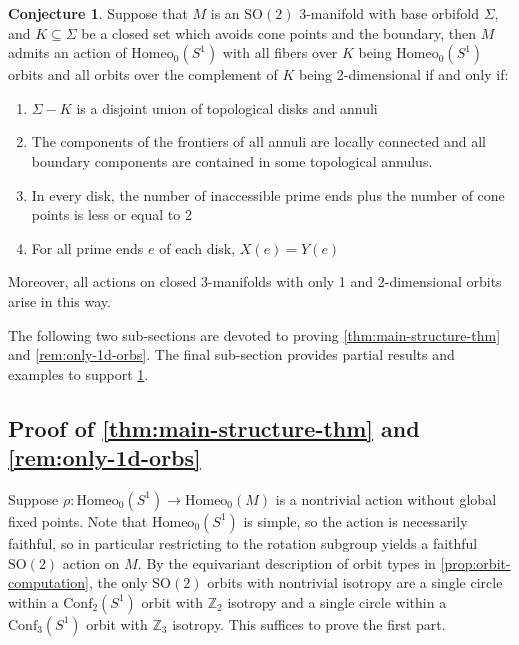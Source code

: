 \documentclass[10pt, oneside]{article}
\newcommand{\Z}{\mathbb{Z}}
\newcommand{\SO}[1][2]{\text{SO}(#1)}
\newcommand{\homeo}[1][S^1]{\text{Homeo}_0(#1)}
\newcommand{\conf}[2][S^1]{\text{Conf}_{#2}(#1)}
\theoremstyle{definition}
\newtheorem{conj}{Conjecture}[section]
\theoremstyle{definition}
\begin{document}
\begin{conj}\label{conj:one-and-two-d-orbits}
    Suppose that $M$ is an $\SO$ 3-manifold with base orbifold $\Sigma$, and $K\subseteq\Sigma$ be a closed set which avoids cone points and the boundary, then $M$ admits an action of $\homeo$ with all fibers over $K$ being $\homeo$ orbits and all orbits over the complement of $K$ being 2-dimensional if and only if:
    \begin{enumerate}
        \item $\Sigma - K$ is a disjoint union of topological disks and annuli
        \item The components of the frontiers of all annuli are locally connected and all boundary components are contained in some topological annulus.
        \item In every disk, the number of inaccessible prime ends plus the number of cone points is less or equal to 2
        \item For all prime ends $e$ of each disk, $X(e) = Y(e)$
    \end{enumerate}
    Moreover, all actions on closed 3-manifolds with only 1 and 2-dimensional orbits arise in this way.
\end{conj}

The following two sub-sections are devoted to proving \cref{thm:main-structure-thm} and \cref{rem:only-1d-orbs}. The final sub-section provides partial results and examples to support \cref{conj:one-and-two-d-orbits}.

\subsection{Proof of \texorpdfstring{\cref{thm:main-structure-thm}}{Theorem \ref*{thm:main-structure-thm}} and \texorpdfstring{\cref{rem:only-1d-orbs}}{Remark \ref*{rem:only-1d-orbs}}}
Suppose $\rho: \homeo \to \homeo[M]$ is a nontrivial action without global fixed points. Note that $\homeo$ is simple, so the action is necessarily faithful, so in particular restricting to the rotation subgroup yields a faithful $\text{SO}(2)$ action on $M$. By the equivariant description of orbit types in \cref{prop:orbit-computation}, the only $\text{SO}(2)$ orbits with nontrivial isotropy are a single circle within a $\conf[S^1]{2}$ orbit with $\Z_2$ isotropy and a single circle within a $\conf[S^1]{3}$ orbit with $\Z_3$ isotropy. This suffices to prove the first part.
\end{document}
